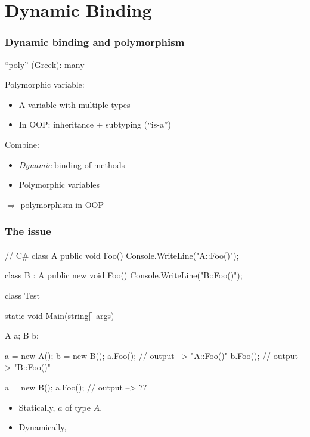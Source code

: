 \section{Dynamic Binding}

\begin{frame}[fragile]

\frametitle{Dynamic binding and polymorphism}
\begin{center}
``poly'' (Greek): many
\end{center}
Polymorphic variable: 
\begin{itemize}
\item A variable with multiple types
\item In OOP: inheritance + subtyping (``is-a'') 
\end{itemize}
Combine:
\begin{itemize}
\item \textit{Dynamic} binding of methods
\item Polymorphic variables
\end{itemize}
$\Longrightarrow$ polymorphism in OOP 

\end{frame}

\begin{frame}[fragile]
\frametitle{The issue}
\framesubtitle{}
%
\begin{cplus3}
        // C# 
        class A {
            public void Foo() { Console.WriteLine("A::Foo()"); }
        }

        class B : A  {
            public new void Foo() { Console.WriteLine("B::Foo()"); }
        }

        class Test {
            static void Main(string[] args)
            {
                A a;
                B b;

                a = new A();
                b = new B();
                a.Foo();  // output --> "A::Foo()"
                b.Foo();  // output --> "B::Foo()"

                a = new B();
                a.Foo();  // output -->  ??
            }
        }
\end{cplus3}
\begin{itemize}
\item Statically, $a$ of type $A$.
\item Dynamically, 
\end{itemize}
\end{frame}



